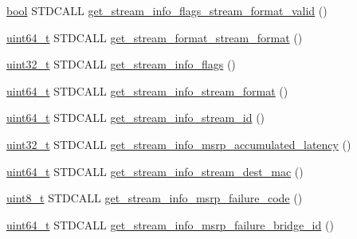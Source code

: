 \begin{DoxyCompactItemize}
\hyperlink{avb__gptp_8h_af6a258d8f3ee5206d682d799316314b1}{bool} S\+T\+D\+C\+A\+LL \hyperlink{classavdecc__lib_1_1stream__input__get__stream__info__response__imp_a4dd38450eed843b0f5f8e75267b18a0e}{get\+\_\+stream\+\_\+info\+\_\+flags\+\_\+stream\+\_\+format\+\_\+valid} ()
\item 
\hyperlink{parse_8c_aec6fcb673ff035718c238c8c9d544c47}{uint64\+\_\+t} S\+T\+D\+C\+A\+LL \hyperlink{classavdecc__lib_1_1stream__input__get__stream__info__response__imp_af415b0e7866128fa11fce7cdcd089a1b}{get\+\_\+stream\+\_\+format\+\_\+stream\+\_\+format} ()
\item 
\hyperlink{parse_8c_a6eb1e68cc391dd753bc8ce896dbb8315}{uint32\+\_\+t} S\+T\+D\+C\+A\+LL \hyperlink{classavdecc__lib_1_1stream__input__get__stream__info__response__imp_a7694ef99f2af4fac732fa2a5128a862d}{get\+\_\+stream\+\_\+info\+\_\+flags} ()
\item 
\hyperlink{parse_8c_aec6fcb673ff035718c238c8c9d544c47}{uint64\+\_\+t} S\+T\+D\+C\+A\+LL \hyperlink{classavdecc__lib_1_1stream__input__get__stream__info__response__imp_a63f777324963f5104c6a788b5d5e2de3}{get\+\_\+stream\+\_\+info\+\_\+stream\+\_\+format} ()
\item 
\hyperlink{parse_8c_aec6fcb673ff035718c238c8c9d544c47}{uint64\+\_\+t} S\+T\+D\+C\+A\+LL \hyperlink{classavdecc__lib_1_1stream__input__get__stream__info__response__imp_af3936cefa1b1b6de8c200f2cb0d0ff32}{get\+\_\+stream\+\_\+info\+\_\+stream\+\_\+id} ()
\item 
\hyperlink{parse_8c_a6eb1e68cc391dd753bc8ce896dbb8315}{uint32\+\_\+t} S\+T\+D\+C\+A\+LL \hyperlink{classavdecc__lib_1_1stream__input__get__stream__info__response__imp_a28cc44ebba58da58b64ee18da7b0af8e}{get\+\_\+stream\+\_\+info\+\_\+msrp\+\_\+accumulated\+\_\+latency} ()
\item 
\hyperlink{parse_8c_aec6fcb673ff035718c238c8c9d544c47}{uint64\+\_\+t} S\+T\+D\+C\+A\+LL \hyperlink{classavdecc__lib_1_1stream__input__get__stream__info__response__imp_a09bd990c165cf70227fec1cc3efe0c1b}{get\+\_\+stream\+\_\+info\+\_\+stream\+\_\+dest\+\_\+mac} ()
\item 
\hyperlink{stdint_8h_aba7bc1797add20fe3efdf37ced1182c5}{uint8\+\_\+t} S\+T\+D\+C\+A\+LL \hyperlink{classavdecc__lib_1_1stream__input__get__stream__info__response__imp_ae1309302604fdeaf7482693e3787c4f7}{get\+\_\+stream\+\_\+info\+\_\+msrp\+\_\+failure\+\_\+code} ()
\item 
\hyperlink{parse_8c_aec6fcb673ff035718c238c8c9d544c47}{uint64\+\_\+t} S\+T\+D\+C\+A\+LL \hyperlink{classavdecc__lib_1_1stream__input__get__stream__info__response__imp_a4270084121240db1d8980249568141df}{get\+\_\+stream\+\_\+info\+\_\+msrp\+\_\+failure\+\_\+bridge\+\_\+id} ()
\end{DoxyCompactItemize}
